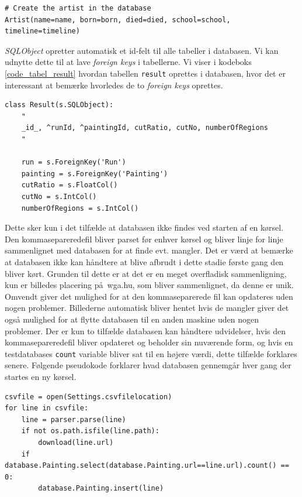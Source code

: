 {\begin{lstlisting}[caption={Oprettelse af en kunstner i databasen.},
    captionpos=b, label={code_new_artist}, frame=tb, breaklines=false,
    float=h]
# Create the artist in the database
Artist(name=name, born=born, died=died, school=school, timeline=timeline)
\end{lstlisting}

\emph{SQLObject} opretter automatisk et id-felt til alle tabeller i
databasen. Vi kan udnytte dette til at lave \emph{foreign keys} i
tabellerne. Vi viser i kodeboks \ref{code_tabel_result} hvordan tabellen
\texttt{result} oprettes i databasen, hvor det er interessant at bemærke
hvorledes de to \emph{foreign keys} oprettes.

\begin{lstlisting}[caption={Pythonkode for oprettelse af \emph{foreign
    keys} i databasen.}, captionpos=b, label={code_tabel_result}, frame=tb,
    breaklines=false, float=h]
class Result(s.SQLObject):
    "
    _id_, ^runId, ^paintingId, cutRatio, cutNo, numberOfRegions
    "

    run = s.ForeignKey('Run')
    painting = s.ForeignKey('Painting')
    cutRatio = s.FloatCol()
    cutNo = s.IntCol()
    numberOfRegions = s.IntCol()
\end{lstlisting}

Dette sker kun i det tilfælde at databasen ikke findes ved starten af en
kørsel. Den kommasepareredefil bliver parset før enhver kørsel og bliver
linje for linje sammenlignet med databasen for at finde evt. mangler.
Det er værd at bemærke at databasen ikke kan håndtere at blive afbrudt i dette stadie første gang den bliver kørt.
Grunden til dette er at det er en meget overfladisk sammenligning, kun
er billedes placering på wga.hu, som bliver sammenlignet, da denne er
unik.
Omvendt giver det mulighed for at den kommaseparerede fil kan opdateres uden nogen
problemer. Billederne automatisk bliver hentet hvis de mangler
giver det også mulighed for at flytte databasen til en anden
maskine uden nogen problemer.
Der er kun to tilfælde databasen kan håndtere udvidelser, hvis den
kommasepareredefil bliver opdateret og beholder sin nuværende form, og
hvis en testdatabases \texttt{count} variable bliver sat til en højere
værdi, dette tilfælde forklares senere.
Følgende pseudokode forklarer hvad databasen gennemgår hver gang der
startes en ny kørsel.
\begin{lstlisting}[caption={Pseudokode for database
initialisering},frame=tb,label={pseudo_init_db}]
csvfile = open(Settings.csvfilelocation)
for line in csvfile:
	line = parser.parse(line)
	if not os.path.isfile(line.path):
		download(line.url)
	if database.Painting.select(database.Painting.url==line.url).count() == 0:
		database.Painting.insert(line)
\end{lstlisting}
}
